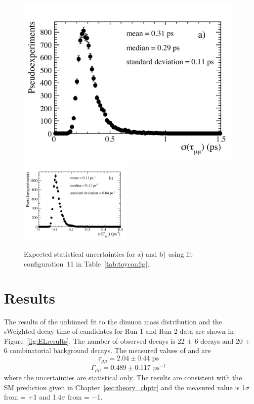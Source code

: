 \begin{figure}[tbp]
    \centering
        \includegraphics[width=0.49 \textwidth]{./Figs/LifetimeMeasurement/5320-6000_tau_err.pdf}
        \includegraphics[width=0.49\textwidth]{./Figs/LifetimeMeasurement/5320-6000_gamma_err.pdf}

    \caption{Expected statistical uncertainties for a) \tmumu and b) \Gmumu using fit configuration~11 in Table~\ref{tab:toyconfig}.}
    \label{fig:exptuncert}
\end{figure}

\clearpage

\section{Results}
\label{sec:ELresults}

The results of the unbinned \ml fit to the dimuon mass distribution and the sWeighted decay time of \bsmumu candidates for Run 1 and Run 2 data are shown in Figure~\ref{fig:ELresults}. The number of observed decays is 22 $\pm$ 6 \bsmumu decays and 20 $\pm$ 6 combinatorial background decays. The measured values of \tmumu and \Gmumu are
\begin{equation}
\tau_{\mu\mu} = 2.04 \pm 0.44  \text{ ps} 
\end{equation}
\begin{equation}
\Gamma_{\mu\mu} = 0.489  \pm 0.117 \text{ ps}^{-1}
\end{equation}
where the uncertainties are statistical only. The results are consistent with the SM prediction given in Chapter~\ref{sec:theory_chptr} and the measured value is 1$\sigma$ from \ADG = +1 and 1.4$\sigma$ from \ADG = $-$1. 

